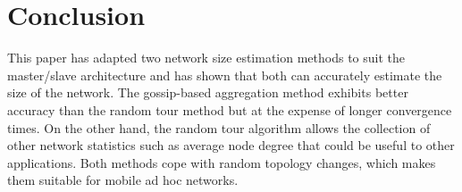 \documentclass[twocolumn,10pt,conference]{IEEEtran}
\begin{document}
 
\section{Conclusion}
This paper has adapted two network size estimation methods to suit the master/slave architecture and has shown that both can 
accurately estimate the size of the network. The gossip-based aggregation method exhibits better accuracy than the random 
tour method but at the expense of longer convergence times. On the other hand, the random tour algorithm allows the 
collection of other network statistics such as average node degree that could be useful to other applications. Both methods cope with random topology 
changes, which makes them suitable for mobile ad hoc networks.




\end{document}
